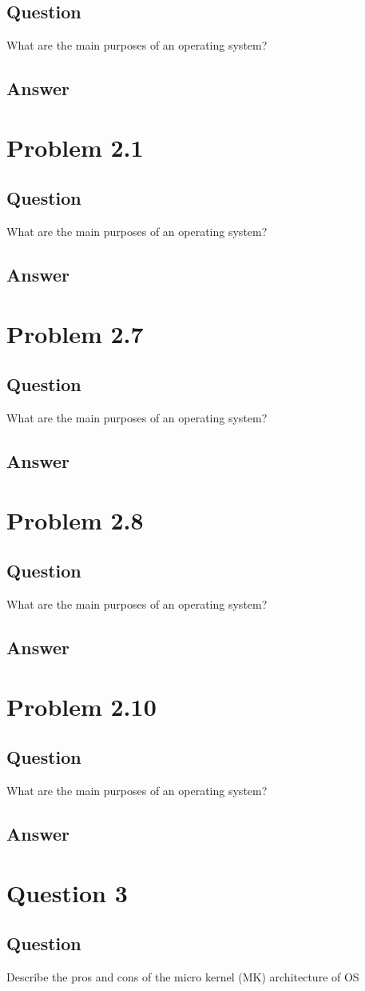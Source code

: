 \documentclass[a4paper]{article}
\begin{document}
\subsection{Question}
\label{sec:org0dfc117}
What are the main purposes of an operating system?
\subsection{Answer}
\label{sec:org264e1e8}
\section{Problem 2.1}
\label{sec:org57b5409}
\subsection{Question}
\label{sec:orgc3348c3}
What are the main purposes of an operating system?
\subsection{Answer}
\label{sec:org93268b4}
\section{Problem 2.7}
\label{sec:org6e4651d}
\subsection{Question}
\label{sec:org9943f31}
What are the main purposes of an operating system?
\subsection{Answer}
\label{sec:orgac227ea}
\section{Problem 2.8}
\label{sec:org8bd5ee2}
\subsection{Question}
\label{sec:orgb355acd}
What are the main purposes of an operating system?
\subsection{Answer}
\label{sec:org5466f12}
\section{Problem 2.10}
\label{sec:orgbe7d897}
\subsection{Question}
\label{sec:orge4ea3c4}
What are the main purposes of an operating system?
\subsection{Answer}
\label{sec:org32a5dd1}
\section{Question 3}
\label{sec:org83605f8}
\subsection{Question}
\label{sec:org8499227}
Describe the pros and cons of the micro kernel (MK) architecture of OS
\end{document}
